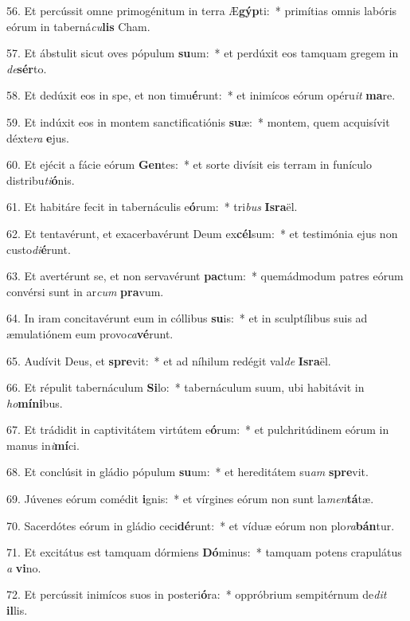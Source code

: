 56. Et percússit omne primogénitum in terra Æ\textbf{gýp}ti:~*  primítias omnis labóris eórum in taberná\textit{cu}\textbf{lis} Cham.\

57. Et ábstulit sicut oves pópulum \textbf{su}um:~*  et perdúxit eos tamquam gregem in \textit{de}\textbf{sér}to.\

58. Et dedúxit eos in spe, et non timu\textbf{é}runt:~*  et inimícos eórum opéru\textit{it} \textbf{ma}re.\

59. Et indúxit eos in montem sanctificatiónis \textbf{su}æ:~*  montem, quem acquisívit déxte\textit{ra} \textbf{e}jus.\

60. Et ejécit a fácie eórum \textbf{Gen}tes:~*  et sorte divísit eis terram in funículo distribu\textit{ti}\textbf{ó}nis.\

61. Et habitáre fecit in tabernáculis e\textbf{ó}rum:~*  tri\textit{bus} \textbf{Is}\textbf{ra}ël.\

62. Et tentavérunt, et exacerbavérunt Deum ex\textbf{cél}sum:~*  et testimónia ejus non custo\textit{di}\textbf{é}runt.\

63. Et avertérunt se, et non servavérunt \textbf{pac}tum:~*  quemádmodum patres eórum convérsi sunt in ar\textit{cum} \textbf{pra}vum.\

64. In iram concitavérunt eum in cóllibus \textbf{su}is:~*  et in sculptílibus suis ad æmulatiónem eum provo\textit{ca}\textbf{vé}runt.\

65. Audívit Deus, et \textbf{spre}vit:~*  et ad níhilum redégit val\textit{de} \textbf{Is}\textbf{ra}ël.\

66. Et répulit tabernáculum \textbf{Si}lo:~*  tabernáculum suum, ubi habitávit in \textit{ho}\textbf{mí}\textbf{ni}bus.\

67. Et trádidit in captivitátem virtútem e\textbf{ó}rum:~*  et pulchritúdinem eórum in manus in\textit{i}\textbf{mí}ci.\

68. Et conclúsit in gládio pópulum \textbf{su}um:~*  et hereditátem su\textit{am} \textbf{spre}vit.\

69. Júvenes eórum comédit \textbf{i}gnis:~*  et vírgines eórum non sunt la\textit{men}\textbf{tá}tæ.\

70. Sacerdótes eórum in gládio ceci\textbf{dé}runt:~*  et víduæ eórum non plo\textit{ra}\textbf{bán}tur.\

71. Et excitátus est tamquam dórmiens \textbf{Dó}minus:~*  tamquam potens crapulátus \textit{a} \textbf{vi}no.\

72. Et percússit inimícos suos in posteri\textbf{ó}ra:~*  oppróbrium sempitérnum de\textit{dit} \textbf{il}lis.\

